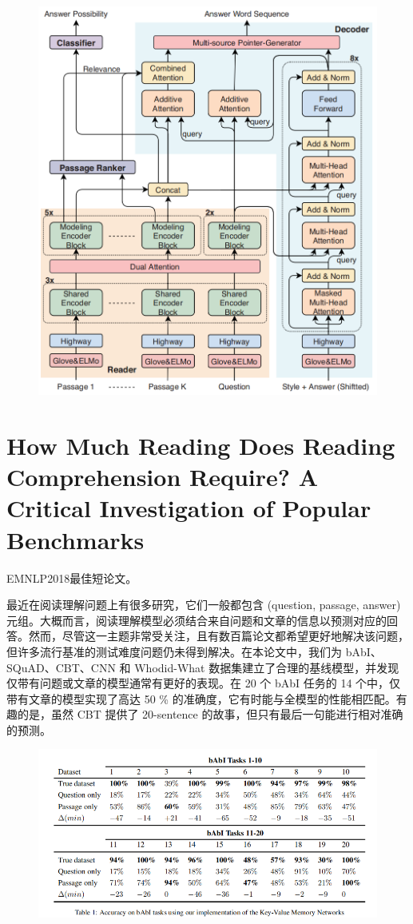 \documentclass[a4paper,UTF8]{article}
\numberwithin{equation}{section}
\begin{document}
\begin{figure}[H]
	\centering
	\includegraphics[width=\textwidth]{9-1.png}
\end{figure}

\newpage
\section{How Much Reading Does Reading Comprehension Require? A Critical Investigation of Popular Benchmarks}
EMNLP2018最佳短论文。

最近在阅读理解问题上有很多研究，它们一般都包含 (question, passage, answer) 元组。大概而言，阅读理解模型必须结合来自问题和文章的信息以预测对应的回答。然而，尽管这一主题非常受关注，且有数百篇论文都希望更好地解决该问题，但许多流行基准的测试难度问题仍未得到解决。在本论文中，我们为 bAbI、SQuAD、CBT、CNN 和 Whodid-What 数据集建立了合理的基线模型，并发现仅带有问题或文章的模型通常有更好的表现。在 20 个 bAbI 任务的 14 个中，仅带有文章的模型实现了高达 50
\% 的准确度，它有时能与全模型的性能相匹配。有趣的是，虽然 CBT 提供了 20-sentence 的故事，但只有最后一句能进行相对准确的预测。
\begin{figure}[H]
	\centering
	\includegraphics[width=\textwidth]{10-1.png}
\end{figure}
\end{document}
